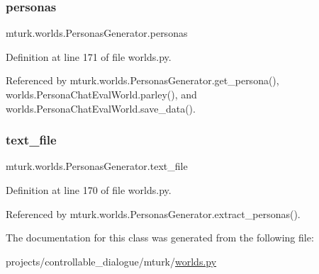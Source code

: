 \subsubsection{\texorpdfstring{personas}{personas}}
{\footnotesize\ttfamily mturk.\+worlds.\+Personas\+Generator.\+personas}



Definition at line 171 of file worlds.\+py.



Referenced by mturk.\+worlds.\+Personas\+Generator.\+get\+\_\+persona(), worlds.\+Persona\+Chat\+Eval\+World.\+parley(), and worlds.\+Persona\+Chat\+Eval\+World.\+save\+\_\+data().

\mbox{\label{classmturk_1_1worlds_1_1PersonasGenerator_ad902f2de2a874e22ac1303f2e6463602}} 
\subsubsection{\texorpdfstring{text\+\_\+file}{text\_file}}
{\footnotesize\ttfamily mturk.\+worlds.\+Personas\+Generator.\+text\+\_\+file}



Definition at line 170 of file worlds.\+py.



Referenced by mturk.\+worlds.\+Personas\+Generator.\+extract\+\_\+personas().



The documentation for this class was generated from the following file\+:\begin{DoxyCompactItemize}
\item 
projects/controllable\+\_\+dialogue/mturk/\hyperlink{projects_2controllable__dialogue_2mturk_2worlds_8py}{worlds.\+py}\end{DoxyCompactItemize}
